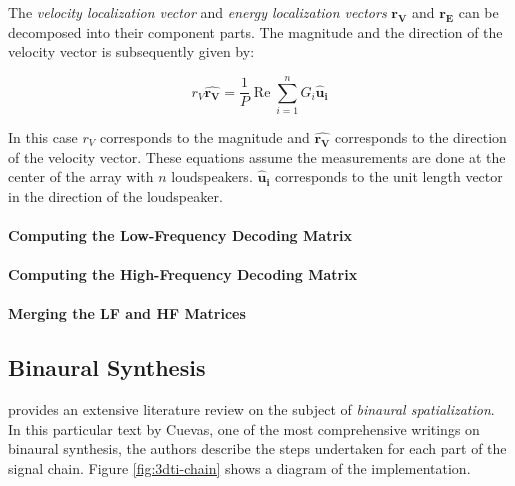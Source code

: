 The \textit{velocity localization vector} and \textit{energy localization vectors} $\mathbf{r_{V}}$ and $\mathbf{r_{E}}$ can be decomposed into their component parts. The magnitude and the direction of the velocity vector is subsequently given by:

\begin{equation}
r_{V} \hat{\mathbf{r}_{\mathbf{V}}}=\frac{1}{P} \operatorname{Re} \sum_{i=1}^{n} G_{i} \hat{\mathbf{u}}_{\mathbf{i}}
\end{equation}

In this case $r_{V}$ corresponds to the magnitude and $\hat{\mathbf{r}_{\mathbf{V}}}$ corresponds to the direction of the velocity vector. These equations assume the measurements are done at the center of the array with $n$ loudspeakers. $\hat{\mathbf{u}}_{\mathbf{i}}$ corresponds to the unit length vector in the direction of the loudspeaker.



\paragraph{Computing the Low-Frequency Decoding Matrix} 



\paragraph{Computing the High-Frequency Decoding Matrix} 



\paragraph{Merging the LF and HF Matrices} 





\subsection{Binaural Synthesis}
\label{subsec:bin-synth}


\cite{cuevas20193d} provides an extensive literature review on the subject of \textit{binaural spatialization}. In this particular text by Cuevas, one of the most comprehensive writings on binaural synthesis, the authors describe the steps undertaken for each part of the signal chain. Figure \ref{fig:3dti-chain} shows a diagram of the implementation. 

